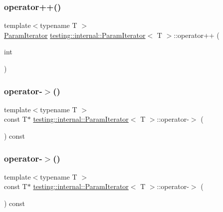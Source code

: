 \subsubsection{\texorpdfstring{operator++()}{operator++()}\hspace{0.1cm}{\footnotesize\ttfamily [6/6]}}
{\footnotesize\ttfamily template$<$typename T $>$ \\
\mbox{\hyperlink{classtesting_1_1internal_1_1_param_iterator}{Param\+Iterator}} \mbox{\hyperlink{classtesting_1_1internal_1_1_param_iterator}{testing\+::internal\+::\+Param\+Iterator}}$<$ T $>$\+::operator++ (\begin{DoxyParamCaption}\item[{int}]{ }\end{DoxyParamCaption})\hspace{0.3cm}{\ttfamily [inline]}}

\mbox{\label{classtesting_1_1internal_1_1_param_iterator_aad035d35e8f0c1412854959a94d4887e}} 
\subsubsection{\texorpdfstring{operator-\/$>$()}{operator->()}\hspace{0.1cm}{\footnotesize\ttfamily [1/3]}}
{\footnotesize\ttfamily template$<$typename T $>$ \\
const T$\ast$ \mbox{\hyperlink{classtesting_1_1internal_1_1_param_iterator}{testing\+::internal\+::\+Param\+Iterator}}$<$ T $>$\+::operator-\/$>$ (\begin{DoxyParamCaption}{ }\end{DoxyParamCaption}) const\hspace{0.3cm}{\ttfamily [inline]}}

\mbox{\label{classtesting_1_1internal_1_1_param_iterator_aad035d35e8f0c1412854959a94d4887e}} 
\subsubsection{\texorpdfstring{operator-\/$>$()}{operator->()}\hspace{0.1cm}{\footnotesize\ttfamily [2/3]}}
{\footnotesize\ttfamily template$<$typename T $>$ \\
const T$\ast$ \mbox{\hyperlink{classtesting_1_1internal_1_1_param_iterator}{testing\+::internal\+::\+Param\+Iterator}}$<$ T $>$\+::operator-\/$>$ (\begin{DoxyParamCaption}{ }\end{DoxyParamCaption}) const\hspace{0.3cm}{\ttfamily [inline]}}

